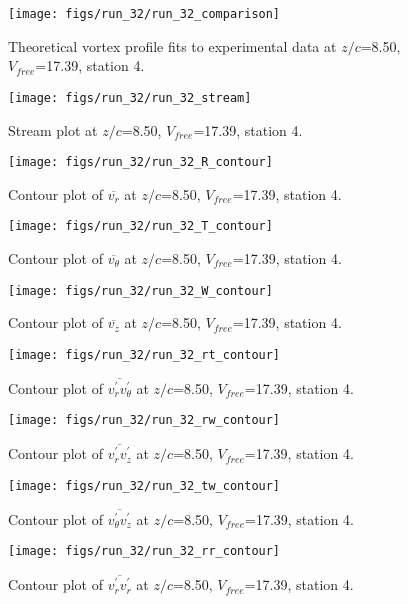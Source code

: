 \begin{figure}[H]
\centering
\texttt{[image: figs/run\_32/run\_32\_comparison]}
\caption{Theoretical vortex profile fits to experimental data at $z/c$=8.50, $V_{free}$=17.39, station 4.}
\end{figure}


\begin{figure}[H]
\centering
\texttt{[image: figs/run\_32/run\_32\_stream]}
\caption{Stream plot at $z/c$=8.50, $V_{free}$=17.39, station 4.}
\end{figure}


\begin{figure}[H]
\centering
\texttt{[image: figs/run\_32/run\_32\_R\_contour]}
\caption{Contour plot of $\overline{v_{r}}$ at $z/c$=8.50, $V_{free}$=17.39, station 4.}
\end{figure}


\begin{figure}[H]
\centering
\texttt{[image: figs/run\_32/run\_32\_T\_contour]}
\caption{Contour plot of $\overline{v_{\theta}}$ at $z/c$=8.50, $V_{free}$=17.39, station 4.}
\end{figure}


\begin{figure}[H]
\centering
\texttt{[image: figs/run\_32/run\_32\_W\_contour]}
\caption{Contour plot of $\overline{v_{z}}$ at $z/c$=8.50, $V_{free}$=17.39, station 4.}
\end{figure}


\begin{figure}[H]
\centering
\texttt{[image: figs/run\_32/run\_32\_rt\_contour]}
\caption{Contour plot of $\overline{v_{r}^{\prime} v_{\theta}^{\prime}}$ at $z/c$=8.50, $V_{free}$=17.39, station 4.}
\end{figure}


\begin{figure}[H]
\centering
\texttt{[image: figs/run\_32/run\_32\_rw\_contour]}
\caption{Contour plot of $\overline{v_{r}^{\prime} v_{z}^{\prime}}$ at $z/c$=8.50, $V_{free}$=17.39, station 4.}
\end{figure}


\begin{figure}[H]
\centering
\texttt{[image: figs/run\_32/run\_32\_tw\_contour]}
\caption{Contour plot of $\overline{v_{\theta}^{\prime} v_{z}^{\prime}}$ at $z/c$=8.50, $V_{free}$=17.39, station 4.}
\end{figure}


\begin{figure}[H]
\centering
\texttt{[image: figs/run\_32/run\_32\_rr\_contour]}
\caption{Contour plot of $\overline{v_{r}^{\prime} v_{r}^{\prime}}$ at $z/c$=8.50, $V_{free}$=17.39, station 4.}
\end{figure}


